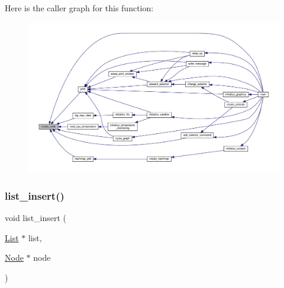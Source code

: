 Here is the caller graph for this function\+:
\nopagebreak
\begin{figure}[H]
\begin{center}
\leavevmode
\includegraphics[width=350pt]{linked-list_8h_a45dfa9366701eddf667fd95d05cc3be0_icgraph}
\end{center}
\end{figure}
\mbox{\label{linked-list_8h_a947069a28d8173531d9186a74e82fb62}} 
\subsubsection{\texorpdfstring{list\+\_\+insert()}{list\_insert()}}
{\footnotesize\ttfamily void list\+\_\+insert (\begin{DoxyParamCaption}\item[{\hyperlink{structList}{List} $\ast$}]{list,  }\item[{\hyperlink{structNode}{Node} $\ast$}]{node }\end{DoxyParamCaption})}

